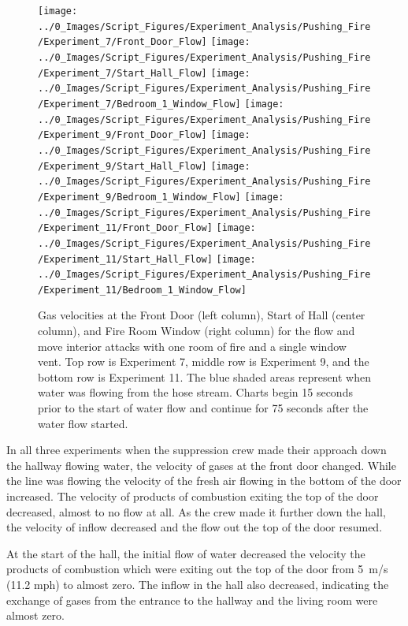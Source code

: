 \documentclass[12pt,oneside]{book}
\begin{document}
\begin{figure}[H]
\centering
\texttt{[image: ../0\_Images/Script\_Figures/Experiment\_Analysis/Pushing\_Fire/Experiment\_7/Front\_Door\_Flow]}
\texttt{[image: ../0\_Images/Script\_Figures/Experiment\_Analysis/Pushing\_Fire/Experiment\_7/Start\_Hall\_Flow]}
\texttt{[image: ../0\_Images/Script\_Figures/Experiment\_Analysis/Pushing\_Fire/Experiment\_7/Bedroom\_1\_Window\_Flow]}
\texttt{[image: ../0\_Images/Script\_Figures/Experiment\_Analysis/Pushing\_Fire/Experiment\_9/Front\_Door\_Flow]}
\texttt{[image: ../0\_Images/Script\_Figures/Experiment\_Analysis/Pushing\_Fire/Experiment\_9/Start\_Hall\_Flow]}
\texttt{[image: ../0\_Images/Script\_Figures/Experiment\_Analysis/Pushing\_Fire/Experiment\_9/Bedroom\_1\_Window\_Flow]}
\texttt{[image: ../0\_Images/Script\_Figures/Experiment\_Analysis/Pushing\_Fire/Experiment\_11/Front\_Door\_Flow]}
\texttt{[image: ../0\_Images/Script\_Figures/Experiment\_Analysis/Pushing\_Fire/Experiment\_11/Start\_Hall\_Flow]}
\texttt{[image: ../0\_Images/Script\_Figures/Experiment\_Analysis/Pushing\_Fire/Experiment\_11/Bedroom\_1\_Window\_Flow]}
\caption[Gas Velocities - Single Room of Fire - Interior - Flow and Move]{Gas velocities at the Front Door (left column), Start of Hall (center column), and Fire Room Window (right column) for the flow and move interior attacks with one room of fire and a single window vent. Top row is Experiment 7, middle row is Experiment 9, and the bottom row is Experiment 11. The blue shaded areas represent when water was flowing from the hose stream. Charts begin 15 seconds prior to the start of water flow and continue for 75 seconds after the water flow started.}
\label{fig:push_fire_interior_flow_move}
\end{figure}

In all three experiments when the suppression crew made their approach down the hallway flowing water, the velocity of gases at the front door changed. While the line was flowing the velocity of the fresh air flowing in the bottom of the door increased. The velocity of products of combustion exiting the top of the door decreased, almost to no flow at all. As the crew made it further down the hall, the velocity of inflow decreased and the flow out the top of the door resumed. 

At the start of the hall, the initial flow of water decreased the velocity the products of combustion which were exiting out the top of the door from 5~m/s (11.2 mph) to almost zero. The inflow in the hall also decreased, indicating the exchange of gases from the entrance to the hallway and the living room were almost zero. 
\end{document}
